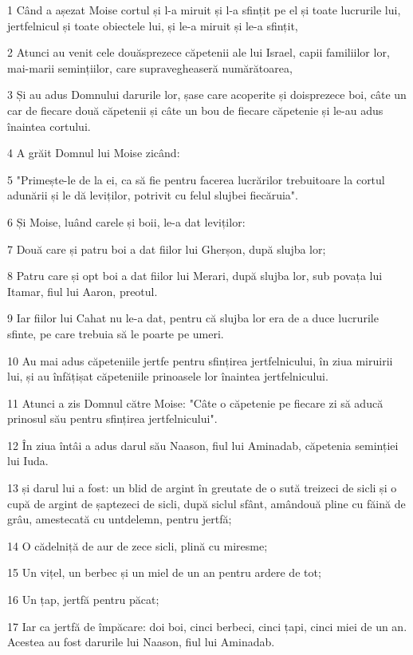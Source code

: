 \par 1 Când a așezat Moise cortul și l-a miruit și l-a sfințit pe el și toate lucrurile lui, jertfelnicul și toate obiectele lui, și le-a miruit și le-a sfințit,
\par 2 Atunci au venit cele douăsprezece căpetenii ale lui Israel, capii familiilor lor, mai-marii semințiilor, care supravegheaseră numărătoarea,
\par 3 Și au adus Domnului darurile lor, șase care acoperite și doisprezece boi, câte un car de fiecare două căpetenii și câte un bou de fiecare căpetenie și le-au adus înaintea cortului.
\par 4 A grăit Domnul lui Moise zicând:
\par 5 "Primește-le de la ei, ca să fie pentru facerea lucrărilor trebuitoare la cortul adunării și le dă leviților, potrivit cu felul slujbei fiecăruia".
\par 6 Și Moise, luând carele și boii, le-a dat leviților:
\par 7 Două care și patru boi a dat fiilor lui Gherșon, după slujba lor;
\par 8 Patru care și opt boi a dat fiilor lui Merari, după slujba lor, sub povața lui Itamar, fiul lui Aaron, preotul.
\par 9 Iar fiilor lui Cahat nu le-a dat, pentru că slujba lor era de a duce lucrurile sfinte, pe care trebuia să le poarte pe umeri.
\par 10 Au mai adus căpeteniile jertfe pentru sfințirea jertfelnicului, în ziua miruirii lui, și au înfățișat căpeteniile prinoasele lor înaintea jertfelnicului.
\par 11 Atunci a zis Domnul către Moise: "Câte o căpetenie pe fiecare zi să aducă prinosul său pentru sfințirea jertfelnicului".
\par 12 În ziua întâi a adus darul său Naason, fiul lui Aminadab, căpetenia seminției lui Iuda.
\par 13 și darul lui a fost: un blid de argint în greutate de o sută treizeci de sicli și o cupă de argint de șaptezeci de sicli, după siclul sfânt, amândouă pline cu făină de grâu, amestecată cu untdelemn, pentru jertfă;
\par 14 O cădelniță de aur de zece sicli, plină cu miresme;
\par 15 Un vițel, un berbec și un miel de un an pentru ardere de tot;
\par 16 Un țap, jertfă pentru păcat;
\par 17 Iar ca jertfă de împăcare: doi boi, cinci berbeci, cinci țapi, cinci miei de un an. Acestea au fost darurile lui Naason, fiul lui Aminadab.
